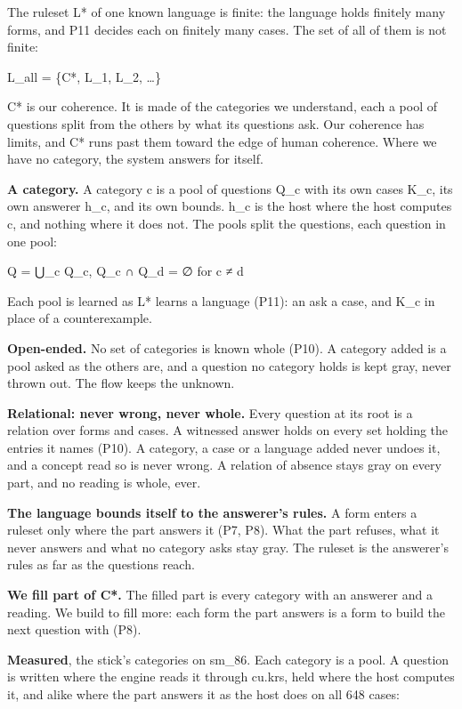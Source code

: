 The ruleset L* of one known language is finite: the language holds finitely many forms, and P11 decides each on finitely many cases. The set of all of them is not finite:

L\_\allowbreak{}all = \{C*, L\_\allowbreak{}1, L\_\allowbreak{}2, …\}

C* is our coherence. It is made of the categories we understand, each a pool of questions split from the others by what its questions ask. Our coherence has limits, and C* runs past them toward the edge of human coherence. Where we have no category, the system answers for itself.

\textbf{A category.} A category c is a pool of questions Q\_\allowbreak{}c with its own cases K\_\allowbreak{}c, its own answerer h\_\allowbreak{}c, and its own bounds. h\_\allowbreak{}c is the host where the host computes c, and nothing where it does not. The pools split the questions, each question in one pool:

Q = ⋃\_\allowbreak{}c Q\_\allowbreak{}c,  Q\_\allowbreak{}c ∩ Q\_\allowbreak{}d = ∅ for c ≠ d

Each pool is learned as L* learns a language (P11): an ask a case, and K\_\allowbreak{}c in place of a counterexample.

\textbf{Open-ended.} No set of categories is known whole (P10). A category added is a pool asked as the others are, and a question no category holds is kept gray, never thrown out. The flow keeps the unknown.

\textbf{Relational: never wrong, never whole.} Every question at its root is a relation over forms and cases. A witnessed answer holds on every set holding the entries it names (P10). A category, a case or a language added never undoes it, and a concept read so is never wrong. A relation of absence stays gray on every part, and no reading is whole, ever.

\textbf{The language bounds itself to the answerer's rules.} A form enters a ruleset only where the part answers it (P7, P8). What the part refuses, what it never answers and what no category asks stay gray. The ruleset is the answerer's rules as far as the questions reach.

\textbf{We fill part of C*.} The filled part is every category with an answerer and a reading. We build to fill more: each form the part answers is a form to build the next question with (P8).

\textbf{Measured}, the stick's categories on sm\_\allowbreak{}86. Each category is a pool. A question is written where the engine reads it through cu.krs, held where the host computes it, and alike where the part answers it as the host does on all 648 cases:

